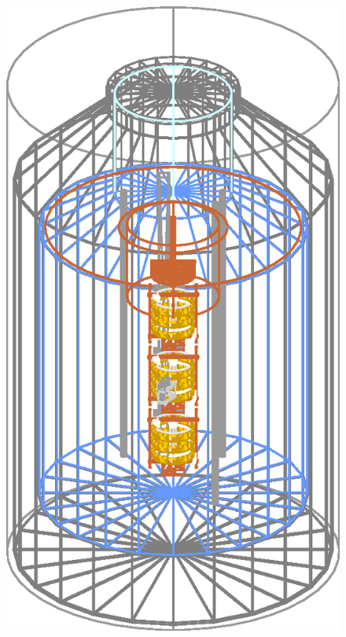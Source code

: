 \begin{figure}[tbhp]
{  \includegraphics[height=0.25\textheight,clip]{GIIwired}}
\subfloat[]{\label{fig:ph:s2}
}
\end{figure}
